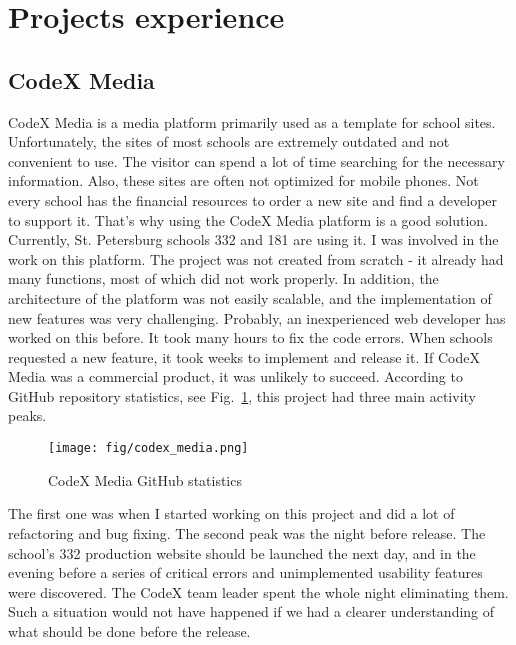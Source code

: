 \documentclass[conference]{IEEEtran}
\begin{document}
    \section{Projects experience}
    \subsection{CodeX Media}
    CodeX Media is a media platform primarily used as a template for school sites.
    Unfortunately, the sites of most schools are extremely outdated and not convenient to use.
    The visitor can spend a lot of time searching for the necessary information.
    Also, these sites are often not optimized for mobile phones.
    Not every school has the financial resources to order a new site and find a developer to support it.
    That's why using the CodeX Media platform is a good solution.
    Currently, St. Petersburg schools 332 and 181 are using it.\newline
    I was involved in the work on this platform.
    The project was not created from scratch - it already had many functions, most of which did not work properly.
    In addition, the architecture of the platform was not easily scalable, and the implementation of new features was very challenging.
    Probably, an inexperienced web developer has worked on this before.
    It took many hours to fix the code errors.
    When schools requested a new feature, it took weeks to implement and release it.
    If CodeX Media was a commercial product, it was unlikely to succeed.\newline
    According to GitHub repository statistics, see Fig.~\ref{fig:media}, this project had three main activity peaks.
    \begin{figure}[h!]
        \centering
        \texttt{[image: fig/codex\_media.png]}
        \caption{CodeX Media GitHub statistics}
        \label{fig:media}
    \end{figure}
    \newline
    The first one was when I started working on this project and did a lot of refactoring and bug fixing.
    The second peak was the night before release.
    The school's 332 production website should be launched the next day, and in the evening before a series of critical errors and unimplemented usability features were discovered.
    The CodeX team leader spent the whole night eliminating them.\newline
    Such a situation would not have happened if we had a clearer understanding of what should be done before the release.
\end{document}
